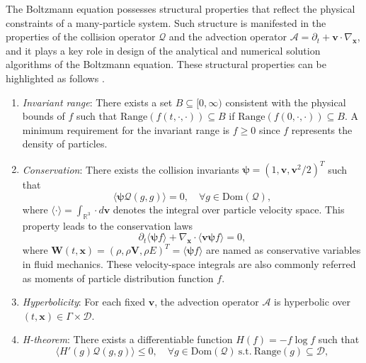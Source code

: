 \documentclass[preprint,3p,12pt,sort&compress]{elsarticle}
\begin{document}
The Boltzmann equation possesses structural properties that reflect the physical constraints of a many-particle system.
Such structure is manifested in the properties of the collision operator $\mathcal Q$ and the advection operator $\mathcal A = \partial_t + \mathbf v \cdot \nabla_{\mathbf x}$, and it plays a key role in design of the analytical and numerical solution algorithms of the Boltzmann equation.
These structural properties can be highlighted as follows \cite{alldredge2019regularized}.

\begin{enumerate}
  \item[(1)] \textit{Invariant range}:
  There exists a set $B \subseteq [0, \infty )$ consistent with the physical bounds of $f$ such that $\mathrm{Range}(f(t, \cdot , \cdot )) \subseteq B$ if $\mathrm{Range}(f(0, \cdot , \cdot )) \subseteq B$. A minimum requirement for the invariant range is $f \geq 0$ since $f$ represents the density of particles.
  \item[(2)] \textit{Conservation}: There exists the collision invariants $\boldsymbol\psi=(1,\mathbf v,\mathbf v^2/2)^T$ such that
  \begin{equation}
    \langle \boldsymbol\psi \mathcal Q(g,g) \rangle = 0, \quad \forall g\in \mathrm{Dom}(\mathcal Q),
  \end{equation}
  where $\langle\cdot\rangle=\int_{\mathbb R^3} \cdot d\mathbf v$ denotes the integral over particle velocity space.
  This property leads to the conservation laws
  \begin{equation}
      \partial_t \langle \boldsymbol\psi f \rangle + \nabla_\mathbf x \cdot \langle \mathbf v \boldsymbol\psi f \rangle = 0,
      \label{eqn:conservation laws}
  \end{equation}
  where $\mathbf{W}(t, \mathbf{x})=(\rho,\rho\mathbf V,\rho E)^T=\langle \boldsymbol\psi f \rangle$ are named as conservative variables in fluid mechanics.
  These velocity-space integrals are also commonly referred as moments of particle distribution function $f$.
  \item[(3)] \textit{Hyperbolicity}: For each fixed $\mathbf v$, the advection operator $\mathcal A$ is hyperbolic over $(t, \mathbf x) \in \Gamma \times \mathcal D$.
  \item[(4)] \textit{H-theorem}: There exists a differentiable function $H(f)=-f\log f$ such that
  \begin{equation}
      \langle H'(g) \mathcal Q(g,g) \rangle \leq 0, \quad \forall g\in \mathrm{Dom}(\mathcal Q) \ \mathrm{s.t.} \ \mathrm{Range}(g) \subseteq \mathcal D,

\end{equation}
\end{enumerate}
\end{document}
